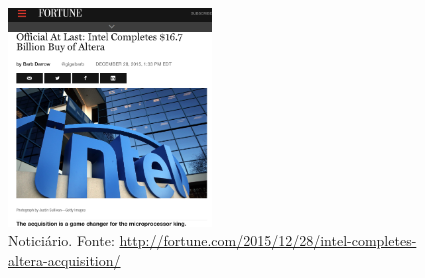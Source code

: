 	\begin{frame}
		\begin{figure}[H]
			\centering
			\includegraphics[width=0.48\textwidth]{img/fpga/intel_altera_2.png}
			\protect\caption{Noticiário. Fonte: \url{http://fortune.com/2015/12/28/intel-completes-altera-acquisition/}}
			\label{fig:intel_altera_noticia}
		\end{figure}
	\end{frame}

